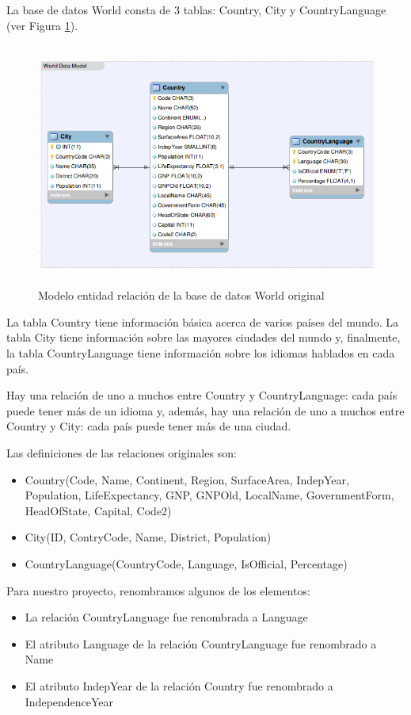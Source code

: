 La base de datos World consta de 3 tablas: Country, City y CountryLanguage (ver Figura \ref{fig:world-db}).

\begin{figure}
  \centering
    \includegraphics[width=12.823cm,height=8.004cm]{graficos/fuentes/world-db.png}
  \caption{Modelo entidad relación de la base de datos World original}
  \label{fig:world-db}
\end{figure}

La tabla Country tiene información básica acerca de varios países del mundo. La tabla City tiene información sobre las mayores ciudades del mundo y, finalmente, la tabla CountryLanguage tiene información sobre los idiomas hablados en cada país.

Hay una relación de uno a muchos entre Country y CountryLanguage: cada país puede tener más de un idioma y, además, hay una relación de uno a muchos entre Country y City: cada país puede tener más de una ciudad.

\medskip
Las definiciones de las relaciones originales son:
\begin{itemize}
\item Country(Code, Name, Continent, Region, SurfaceArea, IndepYear, Population, LifeExpectancy, GNP, GNPOld, LocalName, GovernmentForm, HeadOfState, Capital, Code2)
\item City(ID, ContryCode, Name, District, Population)
\item CountryLanguage(CountryCode, Language, IsOfficial, Percentage)
\end{itemize}


Para nuestro proyecto, renombramos algunos de los elementos:
\begin{itemize}
\item La relación CountryLanguage fue renombrada a Language
\item El atributo Language de la relación CountryLanguage fue renombrado a Name
\item El atributo IndepYear de la relación Country fue renombrado a IndependenceYear
\end{itemize}

